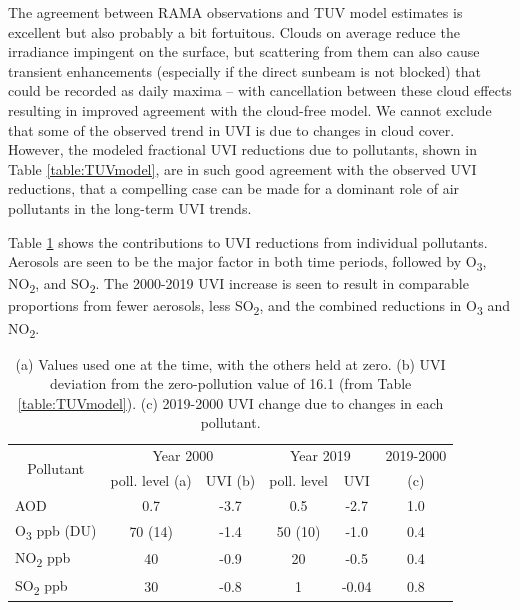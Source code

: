 \documentclass[10pt]{article}
\begin{document}
The agreement between RAMA observations and TUV model estimates is
excellent but also probably a bit fortuitous. Clouds on average reduce
the irradiance impingent on the surface, but scattering from them can
also cause transient enhancements (especially if the direct sunbeam is
not blocked) that could be recorded as daily maxima -- with cancellation
between these cloud effects resulting in improved agreement with the
cloud-free model. We cannot exclude that some of the observed trend in
UVI is due to changes in cloud cover. However, the modeled fractional
UVI reductions due to pollutants, shown in Table
  {\ref{table:TUVmodel}}, are in such good agreement with
the observed UVI reductions, that a compelling case can be made for a
dominant role of air pollutants in the long-term UVI trends.

Table \ref{table:year2000-2019} shows the
contributions to UVI reductions from individual pollutants. Aerosols are
seen to be the major factor in both time periods, followed by
O\textsubscript{3}, NO\textsubscript{2}, and SO\textsubscript{2}. The
2000-2019 UVI increase is seen to result in comparable proportions from
fewer aerosols, less SO\textsubscript{2}, and the combined reductions in
O\textsubscript{3} and NO\textsubscript{2}.
\begin{table}[H]
  \centering
  \begin{tabular}{lccccc}
    \hline
    \multicolumn{1}{c}{\multirow{2}{*}{Pollutant}} & \multicolumn{2}{c}{Year 2000} & \multicolumn{2}{c}{Year 2019} & 2019-2000                 \\ \cline{2-6}
    \multicolumn{1}{c}{}                           & poll. level (a)               & UVI (b)                       & poll. level & UVI   & (c) \\ \hline
    AOD                                            & 0.7                           & -3.7                          & 0.5         & -2.7  & 1.0 \\
    O\textsubscript{3} ppb (DU)                    & 70 (14)                       & -1.4                          & 50 (10)     & -1.0  & 0.4 \\
    NO\textsubscript{2} ppb                        & 40                            & -0.9                          & 20          & -0.5  & 0.4 \\
    SO\textsubscript{2} ppb                        & 30                            & -0.8                          & 1           & -0.04 & 0.8 \\ \hline
  \end{tabular}
  \caption{{(a) Values used one at the time, with the others held at zero. (b) UVI deviation from the zero-pollution value of 16.1 (from Table \ref{table:TUVmodel}). (c) 2019-2000 UVI change due to changes in each pollutant.}}
  \label{table:year2000-2019}
\end{table}
\end{document}
